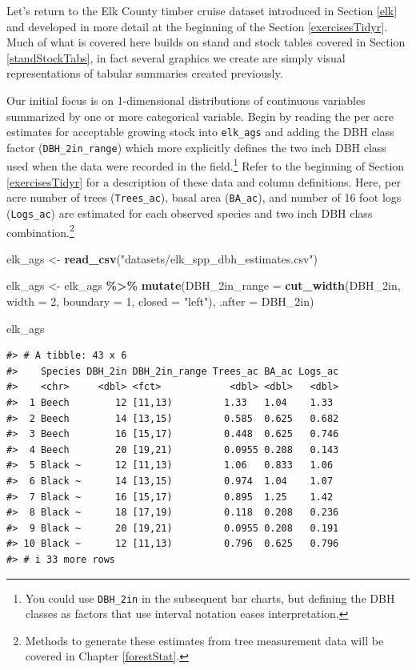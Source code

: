 \documentclass[
  11pt,
]{krantz}
\newenvironment{Shaded}{\begin{snugshade}}{\end{snugshade}}
\newcommand{\DataTypeTok}[1]{\textcolor[rgb]{0.13,0.29,0.53}{#1}}
\newcommand{\DecValTok}[1]{\textcolor[rgb]{0.00,0.00,0.81}{#1}}
\newcommand{\KeywordTok}[1]{\textcolor[rgb]{0.13,0.29,0.53}{\textbf{#1}}}
\newcommand{\NormalTok}[1]{#1}
\newcommand{\OperatorTok}[1]{\textcolor[rgb]{0.81,0.36,0.00}{\textbf{#1}}}
\newcommand{\StringTok}[1]{\textcolor[rgb]{0.31,0.60,0.02}{#1}}
\theoremstyle{definition}
\theoremstyle{definition}
\theoremstyle{definition}
\theoremstyle{definition}
\theoremstyle{remark}
\begin{document}
Let's return to the Elk County timber cruise dataset introduced in Section \ref{elk} and developed in more detail at the beginning of the Section \ref{exercisesTidyr}. Much of what is covered here builds on stand and stock tables covered in Section \ref{standStockTabs}, in fact several graphics we create are simply visual representations of tabular summaries created previously.

Our initial focus is on 1-dimensional distributions of continuous variables summarized by one or more categorical variable. Begin by reading the per acre estimates for acceptable growing stock into \texttt{elk\_ags} and adding the DBH class factor (\texttt{DBH\_2in\_range}) which more explicitly defines the two inch DBH class used when the data were recorded in the field.\footnote{You could use \texttt{DBH\_2in} in the subsequent bar charts, but defining the DBH classes as factors that use interval notation eases interpretation.} Refer to the beginning of Section \ref{exercisesTidyr} for a description of these data and column definitions. Here, per acre number of trees (\texttt{Trees\_ac}), basal area (\texttt{BA\_ac}), and number of 16 foot logs (\texttt{Logs\_ac}) are estimated for each observed species and two inch DBH class combination.\footnote{Methods to generate these estimates from tree measurement data will be covered in Chapter \ref{forestStat}.}

\begin{Shaded}
\begin{Highlighting}[]
\NormalTok{elk\_ags \textless{}{-}}\StringTok{ }\KeywordTok{read\_csv}\NormalTok{(}\StringTok{"datasets/elk\_spp\_dbh\_estimates.csv"}\NormalTok{)}

\NormalTok{elk\_ags \textless{}{-}}\StringTok{ }\NormalTok{elk\_ags }\OperatorTok{\%\textgreater{}\%}\StringTok{ }
\StringTok{  }\KeywordTok{mutate}\NormalTok{(}\DataTypeTok{DBH\_2in\_range =} \KeywordTok{cut\_width}\NormalTok{(DBH\_2in, }\DataTypeTok{width =} \DecValTok{2}\NormalTok{, }
                                   \DataTypeTok{boundary =} \DecValTok{1}\NormalTok{, }\DataTypeTok{closed =} \StringTok{"left"}\NormalTok{),}
         \DataTypeTok{.after =}\NormalTok{ DBH\_2in)}

\NormalTok{elk\_ags}
\end{Highlighting}
\end{Shaded}

\begin{verbatim}
#> # A tibble: 43 x 6
#>    Species DBH_2in DBH_2in_range Trees_ac BA_ac Logs_ac
#>    <chr>     <dbl> <fct>            <dbl> <dbl>   <dbl>
#>  1 Beech        12 [11,13)         1.33   1.04    1.33 
#>  2 Beech        14 [13,15)         0.585  0.625   0.682
#>  3 Beech        16 [15,17)         0.448  0.625   0.746
#>  4 Beech        20 [19,21)         0.0955 0.208   0.143
#>  5 Black ~      12 [11,13)         1.06   0.833   1.06 
#>  6 Black ~      14 [13,15)         0.974  1.04    1.07 
#>  7 Black ~      16 [15,17)         0.895  1.25    1.42 
#>  8 Black ~      18 [17,19)         0.118  0.208   0.236
#>  9 Black ~      20 [19,21)         0.0955 0.208   0.191
#> 10 Black ~      12 [11,13)         0.796  0.625   0.796
#> # i 33 more rows
\end{verbatim}
\end{document}
